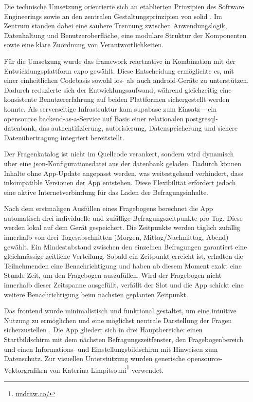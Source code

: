 Die technische Umsetzung orientierte sich an etablierten Prinzipien des Software Engineerings \parencite{sommervilleSoftwareEngineering2016} sowie an den zentralen Gestaltungsprinzipien von \gls{solid} \parencite{martinCleanArchitectureCraftsmans2018}. Im Zentrum standen dabei eine saubere Trennung zwischen Anwendungslogik, Datenhaltung und Benutzeroberfläche, eine modulare Struktur der Komponenten sowie eine klare Zuordnung von Verantwortlichkeiten.

Für die Umsetzung wurde das \gls{framework} \gls{reactnative} in Kombination mit der Entwicklungsplattform \gls{expo} gewählt. Diese Entscheidung ermöglichte es, mit einer einheitlichen Codebasis sowohl \gls{ios}- als auch \gls{android}-Geräte zu unterstützen. Dadurch reduzierte sich der Entwicklungsaufwand, während gleichzeitig eine konsistente Benutzererfahrung auf beiden Plattformen sichergestellt werden konnte. Als serverseitige Infrastruktur kam \gls{supabase} zum Einsatz – ein \gls{opensource} \gls{backend}-as-a-Service auf Basis einer relationalen \gls{postgresql}-\gls{datenbank}, das \gls{authentifizierung}, \gls{autorisierung}, Datenspeicherung und sichere Datenübertragung integriert bereitstellt.

Der Fragenkatalog ist nicht im Quellcode verankert, sondern wird dynamisch über eine \gls{json}-Konfigurationsdatei aus der \gls{datenbank} geladen. Dadurch können Inhalte ohne App-Update angepasst werden, was weitestgehend verhindert, dass inkompatible Versionen der App entstehen. Diese Flexibilität erfordert jedoch eine aktive Internetverbindung für das Laden der Befragungsinhalte.

Nach dem erstmaligen Ausfüllen eines Fragebogens berechnet die App automatisch drei individuelle und zufällige Befragungszeitpunkte pro Tag. Diese werden lokal auf dem Gerät gespeichert. Die Zeitpunkte werden täglich zufällig innerhalb von drei Tagesabschnitten (Morgen, Mittag/Nachmittag, Abend) gewählt. Ein Mindestabstand zwischen den einzelnen Befragungen garantiert eine gleichmässige zeitliche Verteilung. Sobald ein Zeitpunkt erreicht ist, erhalten die Teilnehmenden eine Benachrichtigung und haben ab diesem Moment exakt eine Stunde Zeit, um den Fragebogen auszufüllen. Wird der Fragebogen nicht innerhalb dieser Zeitspanne ausgefüllt, verfällt der Slot und die App schickt eine weitere Benachrichtigung beim nächsten geplanten Zeitpunkt.

Das \gls{frontend} wurde minimalistisch und funktional gestaltet, um eine intuitive Nutzung zu ermöglichen und eine möglichst neutrale Darstellung der Fragen sicherzustellen \parencite{rogersInteractionDesignHumancomputer2023}. Die App gliedert sich in drei Hauptbereiche: einen Startbildschirm mit dem nächsten Befragungszeitfenster, den Fragebogenbereich und einen Informations- und Einstellungsbildschirm mit Hinweisen zum Datenschutz. Zur visuellen Unterstützung wurden generische \gls{opensource}-Vektorgrafiken von Katerina Limpitsouni\footnote{\href{https://undraw.co/}{undraw.co/}} verwendet.


